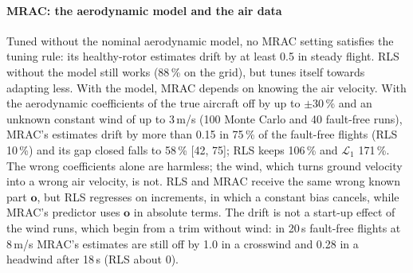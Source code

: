 \documentclass[preprint,12pt,a4paper]{elsarticle}
\newcommand{\vect}[1]{\bm{#1}}
\begin{document}
\paragraph{MRAC: the aerodynamic model and the air data} Tuned without the nominal aerodynamic model, no MRAC setting satisfies the tuning
rule: its healthy-rotor estimates drift by at least 0.5 in steady flight. RLS without the model still works (88\,\% on the grid), but tunes
itself towards adapting less. With the model, MRAC depends on knowing the air velocity. With the aerodynamic coefficients of the true aircraft
off by up to $\pm30$\,\% and an unknown constant wind of up to 3\,m/s (100 Monte Carlo and 40 fault-free runs), MRAC's estimates drift by more
than 0.15 in 75\,\% of the fault-free flights (RLS 10\,\%) and its gap closed falls to 58\,\% [42, 75]; RLS keeps 106\,\% and
$\mathcal{L}_1$ 171\,\%. The wrong coefficients alone are harmless; the wind, which turns ground velocity into a wrong air velocity, is not.
RLS and MRAC receive the same wrong known part $\vect o$, but RLS regresses on increments, in which a constant bias cancels, while MRAC's
predictor uses $\vect o$ in absolute terms. The drift is not a start-up effect of the wind runs, which begin from a trim without wind: in
20\,s fault-free flights at 8\,m/s MRAC's estimates are still off by 1.0 in a crosswind and 0.28 in a headwind after 18\,s (RLS about 0).

\begin{table}[t]
\centering\small
\caption{Sensitivity analyses on the quadplane: gap closed (losses beyond the baseline's in brackets). Mismatch: true aerodynamic coefficients
$\pm30$\,\% and unknown wind up to 3\,m/s (Monte Carlo). Each variant is tuned with the same rule and procedure. MRAC without the aerodynamic
model has no admissible setting.}
\label{tab:sens}
\end{table}
\end{document}
